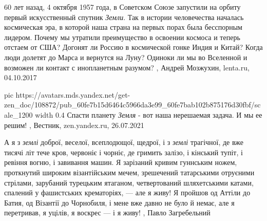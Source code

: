 60 лет назад, 4 октября 1957 года, в Советском Союзе запустили на орбиту первый
искусственный спутник \emph{Земли}. Так в истории человечества началась космическая
эра, в которой наша страна на первых порах была бесспорным лидером. Почему мы
утратили преимущество в освоении космоса и теперь отстаем от США? Догонят ли
Россию в космической гонке Индия и Китай? Когда люди долетят до Марса и
вернутся на Луну? Одиноки ли мы во Вселенной и возможен ли контакт с
инопланетным разумом?
, 
Андрей Мозжухин, lenta.ru, 04.10.2017

\ifcmt
  pic https://avatars.mds.yandex.net/get-zen_doc/108872/pub_60fe7b15d6464c5966da3e99_60fe7bab102b875176d30fbf/scale_1200
  width 0.4
\fi
Спасти планету \emph{Земля} - вот наша нерешаемая задача. И мы ее решим!
, Вестник, zen.yandex.ru, 26.07.2021 

А я з \emph{землі} доброї, веселої, всеплодющої, щедрої, і з \emph{землі}
трагічної, де вже тисячі літ тече кров, червоніє і чорніє, де гримить залізо, і
кінський тупіт, і ревіння вогню, і завивання машин. Я зарізаний кривим
гуннським ножем, проткнутий широким візантійським мечем, зрешечений татарськими
отруєними стрілами, зарубаний турецьким ятаганом, четвертований шляхетськими
катами, спалений у фашистських крематоріях, — але я живу!  Я пройшов од Аттіли
до Батия, од Візантії до Чорнобиля, і мене вже давно не було й немає, але я
перетривав, я уцілів, я воскрес — і я живу!
, Павло Загребельний 
